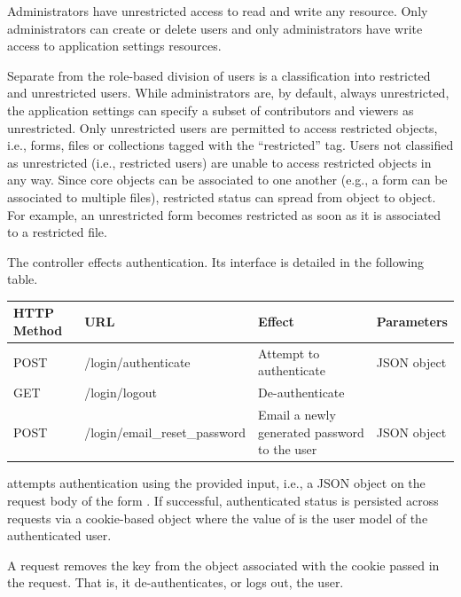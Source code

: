 \documentclass[letterpaper,10pt,english]{sphinxmanual}
\begin{document}
Administrators have unrestricted access to read and write any resource.  Only
administrators can create or delete users and only administrators have write
access to application settings resources.

Separate from the role-based division of users is a classification into
restricted and unrestricted users.  While administrators are, by default, always
unrestricted, the application settings can specify a subset of contributors and
viewers as unrestricted.  Only unrestricted users are permitted to access
restricted objects, i.e., forms, files or collections tagged with the
``restricted'' tag.  Users not classified as unrestricted (i.e., restricted users)
are unable to access restricted objects in any way.  Since core objects can be
associated to one another (e.g., a form can be associated to multiple files),
restricted status can spread from object to object.  For example, an
unrestricted form becomes restricted as soon as it is associated to a restricted
file.

The  controller effects authentication.  Its interface is detailed in
the following table.

\begin{tabulary}{\linewidth}{|L|L|L|L|}
\hline
\textbf{
HTTP Method
} & \textbf{
URL
} & \textbf{
Effect
} & \textbf{
Parameters
}\\\hline

POST
 & 
/login/authenticate
 & 
Attempt to authenticate
 & 
JSON object
\\\hline

GET
 & 
/login/logout
 & 
De-authenticate
 & \\\hline

POST
 & 
/login/email\_reset\_password
 & 
Email a newly generated password to
the user
 & 
JSON object
\\\hline
\end{tabulary}


 attempts authentication using the provided input,
i.e., a JSON object on the request body of the form
.  If successful, authenticated
status is persisted across requests via a cookie-based  object where
the value of  is the user model of the authenticated user.

A  request removes the  key from the 
object associated with the cookie passed in the request.  That is, it
de-authenticates, or logs out, the user.
\end{document}
